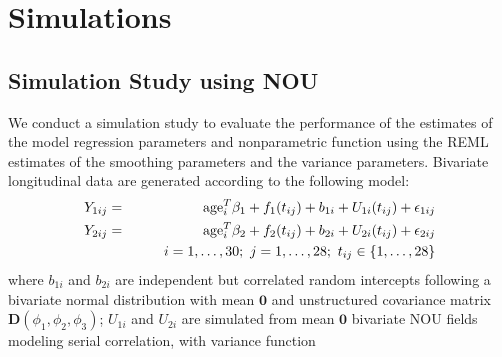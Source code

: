\documentclass[article,lineno]{biometrika}
\begin{document}
%
%
%

\section{Simulations} \label{simulation}
\subsection{Simulation Study using NOU}
We conduct a  simulation study to evaluate the performance of the estimates of the model regression parameters and nonparametric function using the REML estimates of the smoothing parameters and the variance parameters. Bivariate  longitudinal data are generated according to the following model:
\begin{eqnarray*}
Y_{1ij} &=& {\rm age}_i^T  \beta_1 + f_1(t_{ij}) + b_{1i} + U_{1i}(t_{ij}) + \epsilon_{1ij}  \\
Y_{2ij} &=& {\rm age}_i^T  \beta_2 + f_2(t_{ij}) + b_{2i} + U_{2i}(t_{ij}) + \epsilon_{2ij} \\
&& \quad\quad i = 1, \dots, 30; \ j = 1, \dots, 28; \ t_{ij} \in \{1, \dots, 28\}
\end{eqnarray*}
where $ b_{1i}$ and $ b_{2i}$ are independent but correlated random intercepts following a bivariate normal distribution with mean $\bm 0$ and unstructured covariance matrix $\bm D(\phi_1, \phi_2, \phi_3)$;
$U_{1i}$ and $U_{2i}$ are simulated from mean $\bm 0$ bivariate NOU fields modeling serial correlation, with variance function 
\end{document}
